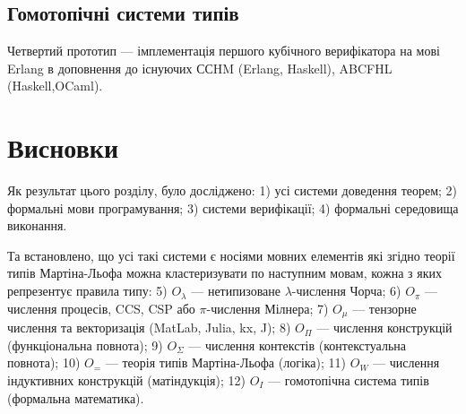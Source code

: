 \subsection{Гомотопічні системи типів}
Четвертий прототип --- імплементація першого кубічного верифікатора на
мові Erlang в доповнення до існуючих ССHM (Erlang, Haskell),
ABCFHL (Haskell,OCaml).

\section{Висновки}
Як результат цього розділу, було досліджено:
1) усі системи доведення теорем;
2) формальні мови програмування;
3) системи верифікації;
4) формальні середовища виконання.

Та встановлено, що усі такі системи є носіями
мовних елементів які згідно теорії типів Мартіна-Льофа можна
кластеризувати по наступним мовам, кожна з яких репрезентує правила типу:
5) $O_\lambda$ --- нетипизоване $\lambda$-числення Чорча;
6) $O_\pi$ --- числення процесів, CCS, CSP або $\pi$-числення Мілнера;
7) $O_\mu$ --- тензорне числення та векторизація (MatLab, Julia, kx, J);
8) $O_\Pi$ --- числення конструкцій (функціональна повнота);
9) $O_\Sigma$ --- числення контекстів (контекстуальна повнота);
10) $O_=$ --- теорія типів Мартіна-Льофа (логіка);
11) $O_W$ --- числення індуктивних конструкцій (матіндукція);
12) $O_I$ --- гомотопічна система типів (формальна математика).
